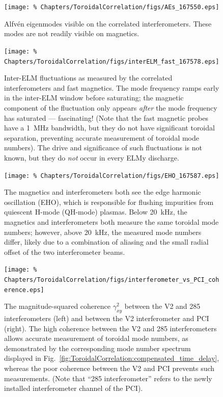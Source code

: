 \begin{figure}[h!]
  \centering
  \texttt{[image: \%
    Chapters/ToroidalCorrelation/figs/AEs\_167550.eps]}
  \caption{Alfv\'{e}n eigenmodes visible
    on the correlated interferometers.
    These modes are not readily visible on magnetics.}
\label{fig:ToroidalCorrelation:AEs}
\end{figure}

\begin{figure}[h!]
  \centering
  \texttt{[image: \%
    Chapters/ToroidalCorrelation/figs/interELM\_fast\_167578.eps]}
  \caption{Inter-ELM fluctuations as measured by
    the correlated interferometers and fast magnetics.
    The mode frequency ramps early in the inter-ELM window before saturating;
    the magnetic component of the fluctuation only appears \emph{after}
    the mode frequency has saturated --- fascinating!
    (Note that the fast magnetic probes have a \SI{1}{\mega\hertz} bandwidth,
    but they do not have significant toroidal separation,
    preventing accurate measurement of toroidal mode numbers).
    The drive and significance of such fluctuations is not known, but
    they do \emph{not} occur in every ELMy discharge.}
\label{fig:ToroidalCorrelation:interELM_fast}
\end{figure}

\begin{figure}[h!]
  \centering
  \texttt{[image: \%
    Chapters/ToroidalCorrelation/figs/EHO\_167587.eps]}
  \caption{The magnetics and interferometers both see the
    edge harmonic oscillation (EHO), which is responsible for
    flushing impurities from quiescent H-mode (QH-mode) plasmas.
    Below \SI{20}{\kilo\hertz}, the magnetics and interferometers
    both measure the same toroidal mode numbers; however,
    above \SI{20}{\kilo\hertz}, the measured mode numbers differ,
    likely due to a combination of aliasing and the small radial offset
    of the two interferometer beams.}
\label{fig:ToroidalCorrelation:EHO}
\end{figure}

\begin{figure}[h!]
  \centering
  \texttt{[image: \%
    Chapters/ToroidalCorrelation/figs/interferometer\_vs\_PCI\_coherence.eps]}
  \caption[%
    Inability to correlate V2 and PCI]{%
      The magnitude-squared coherence $\gamma_{xy}^2$ between
      the V2 and 285 interferometers (left) and
      between the V2 interferometer and PCI (right).
      The high coherence between the V2 and 285 interferometers
      allows accurate measurement of toroidal mode numbers,
      as demonstrated by the corresponding mode number spectrum
      displayed in Fig.~\ref{fig:ToroidalCorrelation:compensated_time_delay},
      whereas the poor coherence between the V2 and PCI
      prevents such measurements.
      (Note that ``285 interferometer'' refers to
      the newly installed interferometer channel of the PCI).}
\label{fig:ToroidalCorrelation:PCI_coherence}
\end{figure}





